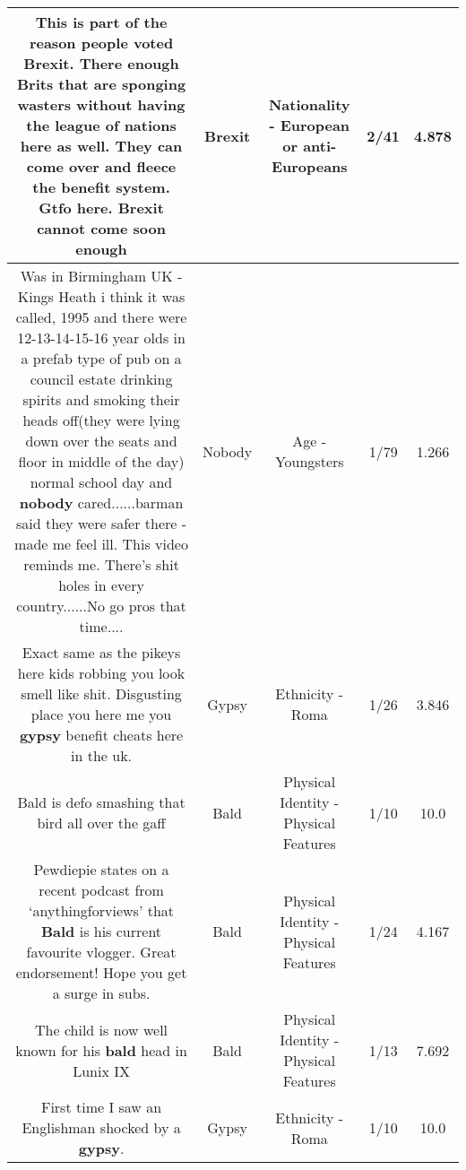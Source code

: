 \documentclass[11pt]{article}
\newlength\mylength
\begin{document}
\begin{center}
\begin{longtable}{|C{.65\mylength}|C{.30\mylength}|C{.12\mylength}|C{.12\mylength}|C{.12\mylength}|}
  \small This is part of the reason people voted \textbf{Brexit}. There enough Brits that are sponging wasters without having the league of nations here as well. They can come over and fleece the benefit system. Gtfo here. \textbf{Brexit} cannot come soon enough\normalsize   & Brexit & Nationality - European or anti-Europeans & 2/41 & 4.878 \\  \hline
  \small Was in Birmingham UK - Kings Heath i think it was called, 1995 and there were 12-13-14-15-16 year olds in a prefab type of pub on a council estate drinking spirits and smoking their heads off(they were lying down over the seats and floor in middle of the day) normal school day and \textbf{nobody} cared......barman said they were safer there - made me feel ill. This video reminds me. There's shit holes in every country......No go pros that time....\normalsize   & Nobody & Age - Youngsters & 1/79 & 1.266 \\  \hline
  \small Exact same as the pikeys here kids robbing you look smell like shit. Disgusting place you here me you \textbf{gypsy} benefit cheats here in the uk.\normalsize   & Gypsy & Ethnicity - Roma & 1/26 & 3.846 \\  \hline
  \small Bald is defo smashing that bird all over the gaff\normalsize   & Bald & Physical Identity - Physical Features & 1/10 & 10.0 \\  \hline
  \small Pewdiepie states on a recent podcast from ‘anythingforviews' that \textbf{Bald} is his current favourite vlogger. Great endorsement! Hope you get a surge in subs.\normalsize   & Bald & Physical Identity - Physical Features & 1/24 & 4.167 \\  \hline
  \small The child is now well known for his \textbf{bald} head  in Lunix IX\normalsize   & Bald & Physical Identity - Physical Features & 1/13 & 7.692 \\  \hline
  \small First time I saw an Englishman shocked by a \textbf{gypsy}.\normalsize   & Gypsy & Ethnicity - Roma & 1/10 & 10.0 \\  \hline

\end{longtable}
\end{center}
\end{document}

